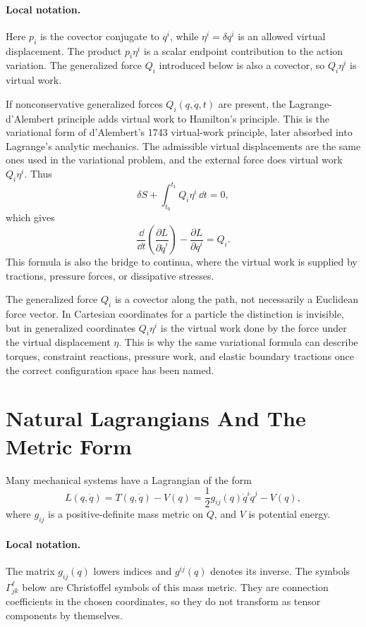 \paragraph{Local notation.}
Here \(p_i\) is the covector conjugate to \(q^i\), while \(\eta^i=\delta q^i\)
is an allowed virtual displacement.  The product \(p_i\eta^i\) is a scalar
endpoint contribution to the action variation.  The generalized force \(Q_i\)
introduced below is also a covector, so \(Q_i\eta^i\) is virtual work.

If nonconservative generalized forces \(Q_i(q,\dot q,t)\) are present, the
Lagrange-d'Alembert principle adds virtual work to Hamilton's principle. This
is the variational form of d'Alembert's 1743 virtual-work principle, later
absorbed into Lagrange's analytic mechanics. The admissible virtual
displacements are the same ones used in the variational problem, and the
external force does virtual work \(Q_i\eta^i\). Thus
\[
  \delta S+\int_{t_0}^{t_1}Q_i\eta^i\,\dd t=0,
\]
which gives
\[
  \frac{\dd}{\dd t}\left(\frac{\partial L}{\partial \dot q^i}\right)
  -
  \frac{\partial L}{\partial q^i}
  =
  Q_i.
\]
This formula is also the bridge to continua, where the virtual work is supplied
by tractions, pressure forces, or dissipative stresses.

The generalized force \(Q_i\) is a covector along the path, not necessarily a
Euclidean force vector. In Cartesian coordinates for a particle the distinction
is invisible, but in generalized coordinates \(Q_i\eta^i\) is the virtual work
done by the force under the virtual displacement \(\eta\). This is why the
same variational formula can describe torques, constraint reactions, pressure
work, and elastic boundary tractions once the correct configuration space has
been named.

\section{Natural Lagrangians And The Metric Form}
\label{sec:natural-lagrangians}

Many mechanical systems have a Lagrangian of the form
\[
  L(q,\dot q)=T(q,\dot q)-V(q)
  =
  \frac{1}{2}g_{ij}(q)\dot q^i\dot q^j - V(q),
\]
where \(g_{ij}\) is a positive-definite mass metric on \(Q\), and \(V\) is
potential energy.

\paragraph{Local notation.}
The matrix \(g_{ij}(q)\) lowers indices and \(g^{ij}(q)\) denotes its inverse.
The symbols \(\Gamma^\ell_{jk}\) below are Christoffel symbols of this mass
metric.  They are connection coefficients in the chosen coordinates, so they
do not transform as tensor components by themselves.

